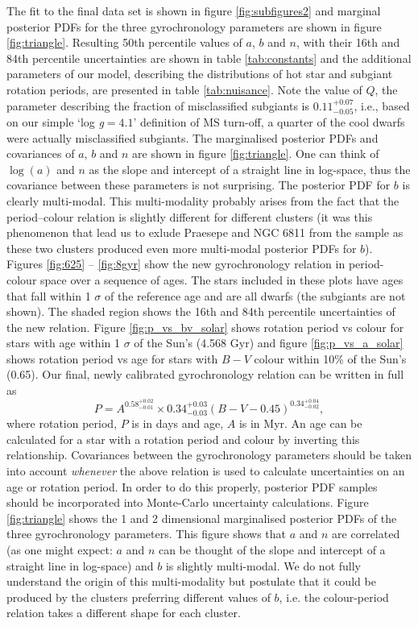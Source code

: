 \documentclass[11pt,preprint]{aastex}
\newcommand{\logg}{log \emph{g}}
\newcommand{\gyroa}{0.34}
\newcommand{\aerrp}{0.03}
\newcommand{\aerrm}{0.03}
\newcommand{\gyron}{0.58}
\newcommand{\nerrp}{0.02}
\newcommand{\nerrm}{0.01}
\newcommand{\gyrob}{0.34}
\newcommand{\berrp}{0.04}
\newcommand{\berrm}{0.02}
\newcommand{\Q}{0.11}
\newcommand{\Qerrp}{0.07}
\newcommand{\Qerrm}{0.05}
\begin{document}
The fit to the final data set is shown in figure \ref{fig:subfigures2} and
marginal posterior PDFs for the three gyrochronology parameters are
shown in figure \ref{fig:triangle}.
Resulting 50th percentile values of $a$, $b$ and $n$, with their 16th and 84th
percentile uncertainties are shown in table \ref{tab:constants} and the
additional parameters of our model, describing the distributions of hot star
and subgiant rotation periods, are presented in table \ref{tab:nuisance}.
Note the value of $Q$, the parameter describing the fraction of misclassified
subgiants is $\Q^{+\Qerrp}_{-\Qerrm}$, i.e., based on our simple `\logg$=4.1$'
definition of MS turn-off, a quarter of the cool dwarfs were actually
misclassified subgiants.
The marginalised posterior PDFs and covariances of $a$, $b$ and $n$ are shown
in figure \ref{fig:triangle}.
One can think of $\log(a)$ and $n$ as the slope and intercept of a straight
line in log-space, thus the covariance between these parameters is not
surprising.
The posterior PDF for $b$ is clearly multi-modal.
This multi-modality probably arises from the fact that the period--colour
relation is slightly different for different clusters (it was this phenomenon
that lead us to exlude Praesepe and NGC 6811 from the sample as these two
clusters produced even more multi-modal posterior PDFs for $b$).
Figures \ref{fig:625} -- \ref{fig:8gyr} show the new gyrochronology relation
in period-colour space over a sequence of ages.
The stars included in these plots have ages that fall within 1 $\sigma$ of the
reference age and are all dwarfs (the subgiants are not shown).
The shaded region shows the 16th and 84th percentile uncertainties of the new
relation.
Figure \ref{fig:p_vs_bv_solar} shows rotation period vs colour for stars with
age within 1 $\sigma$ of the Sun's (4.568 Gyr) and figure
\ref{fig:p_vs_a_solar} shows rotation period vs age for stars with $B-V$
colour within 10\% of the Sun's (0.65).
Our final, newly calibrated gyrochronology relation can be written in full as
\begin{equation}
	P = A^{\gyron^{+\nerrp}_{-\nerrm}} \times \gyroa^{+\aerrp}_{-\aerrm}
	(B-V-0.45)^{\gyrob^{+\berrp}_{-\berrm}},
\label{eq:Barnes2007_3}
\end{equation}
where rotation period, $P$ is in days and age, $A$ is in Myr.
An age can be calculated for a star with a rotation period and colour by
inverting this relationship.
Covariances between the gyrochronology parameters should
be taken into account {\it whenever} the above relation is used to calculate
uncertainties on an age or rotation period.
In order to do this properly, posterior PDF samples should be incorporated into
Monte-Carlo uncertainty calculations.
Figure \ref{fig:triangle} shows the 1 and 2 dimensional marginalised posterior
PDFs of the three gyrochronology parameters.
This figure shows that $a$ and $n$ are correlated (as one might expect: $a$ and
$n$ can be thought of the slope and intercept of a straight line in log-space)
and $b$ is slightly multi-modal.
We do not fully understand the origin of this multi-modality but postulate that
it could be produced by the clusters preferring different values of $b$, i.e.
the colour-period relation takes a different shape for each cluster.
\end{document}
